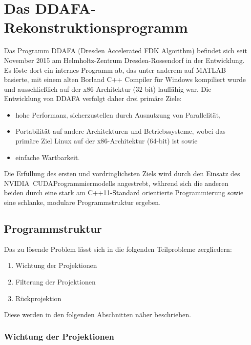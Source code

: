 \chapter{Das DDAFA-Rekonstruktionsprogramm}

Das Programm DDAFA (Dresden Accelerated FDK Algorithm) befindet sich seit November 2015 am Helmholtz-Zentrum Dresden-Rossendorf in der Entwicklung.
Es löste dort ein internes Programm ab, das unter anderem auf MATLAB basierte, mit einem alten Borland C++ Compiler für Windows kompiliert wurde und
ausschließlich auf der x86-Architektur (32-bit) lauffähig war. Die Entwicklung von DDAFA verfolgt daher drei primäre Ziele:

\begin{itemize}
\item hohe Performanz, sicherzustellen durch Ausnutzung von Parallelität,
\item Portabilität auf andere Architekturen und Betriebssysteme, wobei das primäre Ziel Linux auf der x86-Architektur (64-bit) ist sowie
\item einfache Wartbarkeit.
\end{itemize}

Die Erfüllung des ersten und vordringlichsten Ziels wird durch den Einsatz des NVIDIA\textregistered\ CUDA\textregistered\-Programmiermodells angestrebt,
während sich die anderen beiden durch eine stark am C++11-Standard orientierte Programmierung sowie eine schlanke, modulare Programmstruktur ergeben.

\section{Programmstruktur}

Das zu lösende Problem lässt sich in die folgenden Teilprobleme zergliedern:

\begin{enumerate}
\item Wichtung der Projektionen
\item Filterung der Projektionen
\item Rückprojektion 
\end{enumerate}

Diese werden in den folgenden Abschnitten näher beschrieben.

\subsection{Wichtung der Projektionen}

